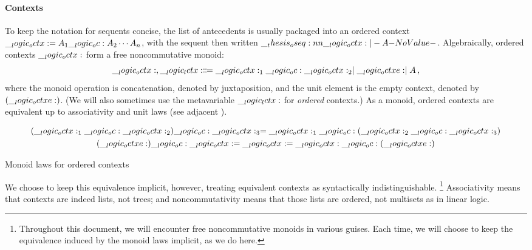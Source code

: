 \paragraph{Contexts}
To keep the notation for sequents concise, the list of antecedents is usually packaged into an ordered context $\__logic_octx: = A_1 \__logic_oc: A_2 \dotsb A_n$, with the sequent then written $\oseq{\octx |- A}$.
Algebraically, ordered contexts $\__logic_octx:$ form a free noncommutative monoid:
\begin{equation*}
  \__logic_octx: , \__logic_lctx: \Coloneqq \__logic_octx:_1 \__logic_oc: \__logic_octx:_2 \mid \__logic_octxe: \mid A \,,
\end{equation*}
where the monoid operation is concatenation, denoted by juxtaposition, and the unit element is the empty context, denoted by $(\__logic_octxe:)$.
(We will also sometimes use the metavariable $\__logic_lctx:$ for \emph{ordered} contexts.)
As a monoid, ordered contexts are equivalent up to associativity and unit laws (see adjacent ).%
\begin{marginfigure}
  \begin{gather*}
    (\__logic_octx:_1 \__logic_oc: \__logic_octx:_2) \__logic_oc: \__logic_octx:_3 = \__logic_octx:_1 \__logic_oc: (\__logic_octx:_2 \__logic_oc: \__logic_octx:_3) \\
    (\__logic_octxe:) \__logic_oc: \__logic_octx: = \__logic_octx: = \__logic_octx: \__logic_oc: (\__logic_octxe:)
  \end{gather*}
  \caption{Monoid laws for ordered contexts}\label{fig:ordered-logic:monoid-laws}
\end{marginfigure}
We choose to keep this equivalence implicit, however, treating equivalent contexts as syntactically indistinguishable.%
\footnote{Throughout this document, we will encounter free noncommutative monoids in various guises.
Each time, we will choose to keep the equivalence induced by the monoid laws implicit, as we do here.}
%
Associativity means that contexts are indeed lists, not trees; and noncommutativity means that those lists are ordered, not multisets as in linear logic.





